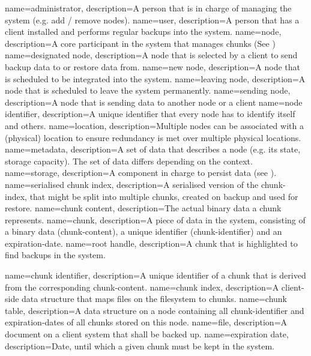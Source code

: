 {
    name={administrator},
    description={A person that is in charge of managing the system (e.g. add / remove nodes).}
}
{
    name={user},
    description={A person that has a \gls{client} installed and performs regular backups into the system.}
}
{
    name={node},
    description={A core participant in the system that manages \glspl{chunk} (See )}
}
{
    name={designated node},
    description={A \gls{node} that is selected by a \gls{client} to send backup data to or restore data from.}
}
{
    name={new node},
    description={A \gls{node} that is scheduled to be integrated into the system.}
}
{
    name={leaving node},
    description={A \gls{node} that is scheduled to leave the system permanently.}
}
{
    name={sending node},
    description={A \gls{node} that is sending data to another node or a client}
}
{
    name={node identifier},
    description={A unique identifier that every node has to identify itself and others.}
}
{
    name={location},
    description={Multiple nodes can be associated with a (physical) location to ensure redundancy is met over multiple physical locations.}
}
{
    name={metadata},
    description={A set of data that describes a \gls{node} (e.g. its state, storage capacity). The set of data differs depending on the context.}
}
{
    name={storage},
    description={A component in charge to persist data (see ).}
}
{
    name={serialised chunk index},
    description={A serialised version of the \gls{chunk-index}, that might be split into multiple chunks, created on backup and used for restore.}
}
{
    name={chunk content},
    description={The actual binary data a chunk represents.}
}
{
    name={chunk},
    description={A piece of data in the system, consisting of a binary data (\gls{chunk-content}), a unique identifier (\gls{chunk-identifier}) and an \gls{expiration-date}.}
}
{
    name={root handle},
    description={A chunk that is highlighted to find backups in the system.}
}

{
    name={chunk identifier},
    description={A unique identifier of a \gls{chunk} that is derived from the corresponding \gls{chunk-content}.}
}
{
    name={chunk index},
    description={A \gls{client}-side data structure that maps files on the filesystem to chunks.}
}
{
    name={chunk table},
    description={A data structure on a \gls{node} containing all \gls{chunk-identifier} and \glspl{expiration-date} of all \glspl{chunk} stored on this \gls{node}.}
}
{
    name={file},
    description={A document on a client system that shall be backed up.}
}
{
    name={expiration date},
    description={Date, until which a given \gls{chunk} must be kept in the system.}
}

